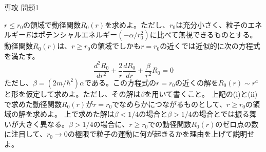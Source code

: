 \documentclass[fleqn]{jbook}
\begin{document}
\begin{question}{専攻 問題1}{}
\begin{subquestions}
\begin{subsubquestions}
\SubSubQuestion
$r\leq r_0$の領域で動径関数$R_0(r)$を求めよ。ただし、$r_0$は充分小さく、粒子のエネルギー$E$はポテンシャルエネルギー$(-\alpha /r_0^2)$に比べて無視できるものとする。
\SubSubQuestion
動径関数$R_0(r)$は、$r\geq r_0$の領域でしかも$r=r_0$の近くでは近似的に次の方程式を満たす。
\[ \frac{d^2 R_0}{dr^2}+\frac{2}{r}\frac{dR_0}{dr}+\frac{\beta}{r^2}R_0=0 \]
ただし、$\beta=(2m/\hbar^2)\alpha$である。この方程式の$r=r_0$の近くの解を$R_0(r) \sim r^{a}$と形を仮定して求めよ。ただし、その解は$\beta$を用いて書くこと。
\SubSubQuestion
上記の(i)と(ii)で求めた動径関数$R_0(r)$が$r=r_0$でなめらかにつながるものとして、$r\geq r_0$の領域の解を求めよ。
\SubSubQuestion
上で求めた解は$\beta<1/4$の場合と$\beta>1/4$の場合とでは振る舞いが大きく異なる。$\beta>1/4$の場合に、$r\geq r_0$での動径関数$R_0(r)$のゼロ点の数に注目して、$r_0 \rightarrow 0$の極限で粒子の運動に何が起きるかを理由を上げて説明せよ。
\end{subsubquestions}
\end{subquestions}
\end{question}
\end{document}
